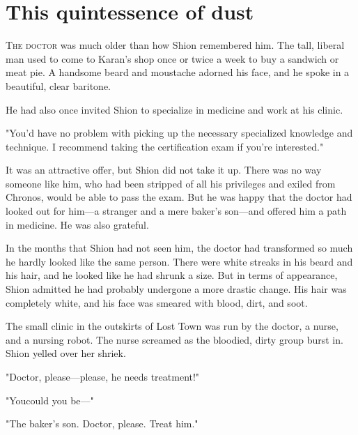 
\chapter{This quintessence of dust}


\lettrine{T}{he doctor} was much older than how Shion remembered him. The tall,
liberal man used to come to Karan's shop once or twice a week to buy a
sandwich or meat pie. A handsome beard and moustache adorned his face,
and he spoke in a beautiful, clear baritone.

He had also once invited Shion to specialize in medicine and work at his
clinic.

"You'd have no problem with picking up the necessary specialized
knowledge and technique. I recommend taking the certification exam if
you're interested."

It was an attractive offer, but Shion did not take it up. There was no
way someone like him, who had been stripped of all his privileges and
exiled from Chronos, would be able to pass the exam. But he was happy
that the doctor had looked out for him---a stranger and a mere baker's
son---and offered him a path in medicine. He was also grateful.

In the months that Shion had not seen him, the doctor had transformed so
much he hardly looked like the same person. There were white streaks in
his beard and his hair, and he looked like he had shrunk a size. But in
terms of appearance, Shion admitted he had probably undergone a more
drastic change. His hair was completely white, and his face was smeared
with blood, dirt, and soot.

The small clinic in the outskirts of Lost Town was run by the doctor, a
nurse, and a nursing robot. The nurse screamed as the bloodied, dirty
group burst in. Shion yelled over her shriek.

"Doctor, please---please, he needs treatment!"

"You\el could you be---"

"The baker's son. Doctor, please. Treat him."

